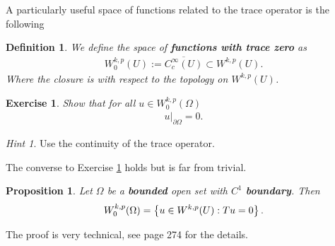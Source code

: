 \documentclass[12pt]{article}
\newtheorem{proposition}{Proposition}
\newtheorem{definition}{Definition}
\newtheorem{exercise}{Exercise}
\theoremstyle{remark}
\newtheorem*{hint}{Hint}
\newcommand\restr[2]{\left.#1\right|_{#2}}
\begin{document}
A particularly useful space of functions related to the trace operator is the following
\begin{definition}
	We define the space of \textbf{functions with trace zero} as
	\begin{align*}
		W^{k,p}_0(U):=\overline{C_c^\infty(U)}\subset W^{k,p}(U).
	\end{align*}
	Where the closure is with respect to the topology on $W^{k,p}(U)$.
\end{definition}
\begin{exercise}\label{trace 0}
	Show that for all $u \in W^{k,p}_0(\Omega)$
	\begin{align*}
		\restr{u}{\partial \Omega}=0.
	\end{align*}
\end{exercise}
\begin{hint}
	Use the continuity of the trace operator.
\end{hint}
The converse to Exercise \ref{trace 0} holds but is far from trivial.
\begin{proposition}
	Let $\Omega$ be a \textbf{bounded} open set with $C^1$  \textbf{boundary}. Then
	\begin{align*}
		W^{k,p}_0(\Omega)=\left\{u \in W^{k,p}(U): Tu=0\right\} .
	\end{align*}
\end{proposition}
The proof is very technical, see \cite{evans2022partial} page 274 for the details.\\
\end{document}
